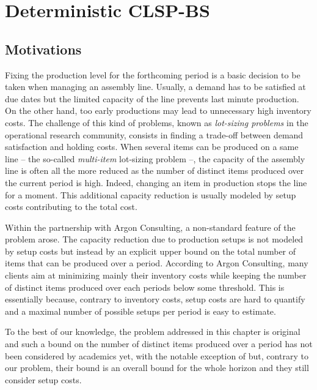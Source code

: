 \chapter{Deterministic CLSP-BS}
\label{chap:PDP:deterministic}


\section{Motivations}
\label{sec:PDP:deterministic:Motivations}

Fixing the production level for the forthcoming period is a basic decision to be taken when managing an assembly line. Usually, a demand has to be satisfied at due dates but the limited capacity of the line prevents last minute production. On the other hand, too early productions may lead to unnecessary high inventory costs. The challenge of this kind of problems, known as {\em lot-sizing problems} in the operational research community, consists in finding a trade-off between demand satisfaction and holding costs.
When several items can be produced on a same line -- the so-called {\em multi-item} lot-sizing problem --, the capacity of the assembly line is often all the more reduced as the number of distinct items produced over the current period is high. Indeed, changing an item in production stops the line for a moment. This additional capacity reduction is usually modeled by setup costs contributing to the total cost.


Within the partnership with Argon Consulting, a non-standard feature of the problem arose. The capacity reduction due to production setups is not modeled by setup costs but instead by an explicit upper bound on the total number of items that can be produced over a period. According to Argon Consulting, many clients aim at minimizing mainly their inventory costs while keeping the number of distinct items produced over each periods below some threshold. This is essentially because, contrary to inventory costs, setup costs are hard to quantify and a maximal number of possible setups per period is easy to estimate.


To the best of our knowledge, the problem addressed in this chapter is original and such a bound on the number of distinct items produced over a period has not been considered by academics yet, with the notable exception of \cite{Rubaszewski2011} but, contrary to our problem, their bound is an overall bound for the whole horizon and they still consider setup costs.


\medskip

